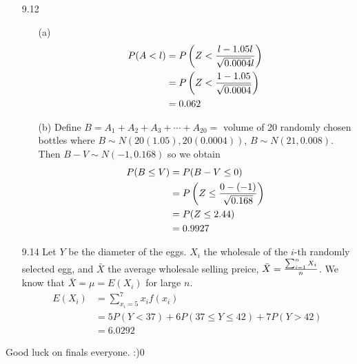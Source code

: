 \documentclass[english, 11pt]{article}
\begin{document}
\begin{itemize}
\item[9.12]
\begin{itemize}
  \item[(a)]
  \begin{align*}
    P(A < l) & = P \left( Z < \frac{l - 1.05l}{\sqrt{0.0004}l} \right) \\
             & = P \left( Z < \frac{1 - 1.05}{\sqrt{0.0004}} \right) \\
             & = 0.062
  \end{align*}
  \item[(b)]
  Define $B = A_1 + A_2 + A_3 + \cdots + A_{20} = $ volume of 20 randomly chosen bottles where $B \sim N(20(1.05), 20(0.0004))$, $B \sim N(21,0.008)$. Then $B - V \sim N(-1, 0.168)$ so we obtain
  \begin{align*}
    P(B \leq V) & = P(B - V \leq 0) \\
    & = P \left(  Z \leq \frac{0 - (-1)}{\sqrt{0.168}} \right) \\
    & = P(Z \leq 2.44) \\
    & = 0.9927
  \end{align*}
\end{itemize}

\item[9.14]
Let $Y$ be the diameter of the eggs. $X_i$ the wholesale of the $i$-th randomly selected egg, and $\bar{X}$ the average wholesale selling preice, $\bar{X} = \frac{\sum_{i=1}^n X_i}{n}$. We know that $\bar{X} = \mu = E(X_i)$ for large $n$.
\begin{align*}
  E(X_i) & = \sum_{x_i = 5}^7 x_if(x_i) \\
  & = 5 P(Y < 37) + 6P(37 \leq Y \leq 42) + 7P(Y > 42) \\
  & = 6.0292
\end{align*}

\end{itemize}

Good luck on finals everyone. :)0
  
\end{document}
